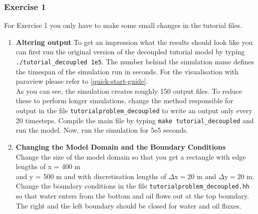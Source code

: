 \subsubsection{Exercise 1}
\renewcommand{\labelenumi}{\alph{enumi})}
For Exercise 1 you only have to make some small changes in the tutorial files.
\begin{enumerate}
\item \textbf{Altering output}
To get an impression what the results should look like you can first run the original version of the decoupled tutorial model by typing  \texttt{./tutorial\_decoupled 1e5}. The number behind the simulation name defines the timespan of the simulation run in seconds. For the visualisation with paraview please refer to \ref{quick-start-guide}.\\
As you can see, the simulation creates roughly 150 output files. To reduce these to perform longer simulations, change the method responsible for output in the file \texttt{tutorialproblem\_decoupled} to write an output only every 20 timesteps. Compile the main file by typing \texttt{make tutorial\_decoupled} and run the model. Now, run the simulation for 5e5 seconds.

\item \textbf{Changing the Model Domain and the Boundary Conditions} \\
Change the size of the model domain so that you get a rectangle
with edge lengths of x = 400 m \\  and y = 500 m and with discretisation lengths of  $\Delta \text{x} = 20$ m and $\Delta \text{y} = 20$ m. \\
Change the boundary conditions in the file \texttt{tutorialproblem\_decoupled.hh} so that water enters from the bottom and oil flows out at the top boundary. The right and the left boundary should be closed for water and oil fluxes.  \\


\end{enumerate}
